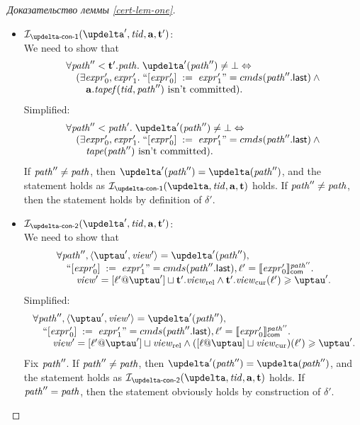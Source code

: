 \begin{proof}[Доказательство леммы \ref{cert-lem-one}]
\begin{itemize}
\begin{itemize}
        \item $\invDeltaDefOne(\delta', \tId, \aT, \tT')$: \\
          We need to show that
          \[\begin{array}{l}
            \forall \cpath'' < \tT'.\cpath. \; \delta'(\cpath'') \not = \bot \Leftrightarrow \\
            \quad (\exists \expr'_0, \expr'_1. \; ``\writeInst{\expr'_0}{\expr'_1}" = \Cprom(\lastInstr{\cpath''})
              \land {} \\
            \qquad \aT.\tapef(\tId, \cpath'') \text{ isn't committed}). \\
          \end{array}\]
          Simplified:
          \[\begin{array}{l}
            \forall \cpath'' < \cpath'. \; \delta'(\cpath'') \not = \bot \Leftrightarrow \\
            \quad (\exists \expr'_0, \expr'_1. \; ``\writeInst{\expr'_0}{\expr'_1}" = \Cprom(\lastInstr{\cpath''})
              \land {} \\
            \qquad \tape(\cpath'') \text{ isn't committed}). \\
          \end{array}\]
          If $\mathit{path}'' \not = \mathit{path}$, then $\delta'(\cpath'') = \delta(\cpath'')$, and the statement holds as
          $\invDeltaDefOne(\delta, \tId, \aT, \tT)$ holds.
          If $\mathit{path}'' \not = \mathit{path}$, then the statement holds by definition of $\delta'$.

        \item $\invDeltaDefTwo(\delta', \tId, \aT, \tT')$: \\
          We need to show that
          \[\begin{array}{l}
            \forall \cpath'', \angled{\tau', \R'} = \delta'(\cpath''), \\
            \quad ``\writeInst{\expr'_0}{\expr'_1}" = \Cprom(\lastInstr{\cpath''}), \loc' = \semfcom{\expr'_0}{\cpath''}. \\
            \qquad \R' = [\loc' @ \tau'] \sqcup \tT'.\Rrel \land \tT'.\Rcur(\loc') \ge \tau'. \\
          \end{array}\]
          Simplified:
          \[\begin{array}{l}
            \forall \cpath'', \angled{\tau', \R'} = \delta'(\cpath''), \\
            \quad ``\writeInst{\expr'_0}{\expr'_1}" = \Cprom(\lastInstr{\cpath''}), \loc' = \semfcom{\expr'_0}{\cpath''}. \\
            \qquad \R' = [\loc' @ \tau'] \sqcup \Rrel \land ([\loc @ \tau] \sqcup \Rcur)(\loc') \ge \tau'. \\
          \end{array}\]
          Fix $\mathit{path}''$. If $\mathit{path}'' \not = \mathit{path}$, then $\delta'(\cpath'') = \delta(\cpath'')$, and the statement holds as
          $\invDeltaDefTwo(\delta, \tId, \aT, \tT)$ holds.
          If $\mathit{path}'' = \mathit{path}$, then the statement obviously holds by construction of $\delta'$.


\end{itemize}
\end{itemize}
\end{proof}
